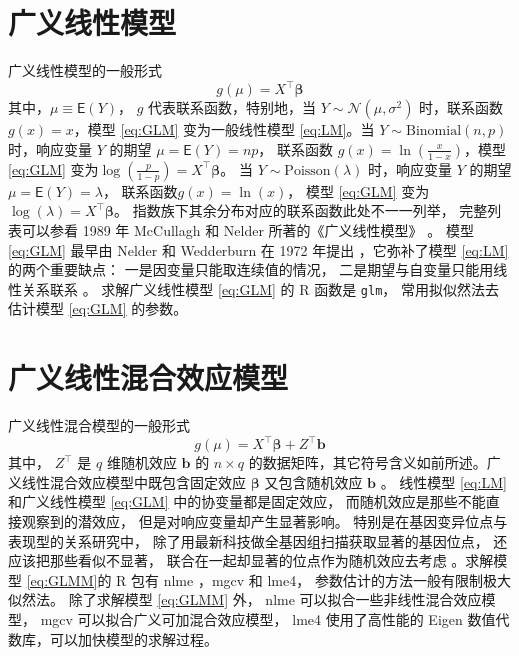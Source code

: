 \documentclass[12pt,a4paper,UTF8,twoside]{book}
\theoremstyle{definition}
\theoremstyle{definition}
\theoremstyle{definition}
\theoremstyle{remark}
\begin{document}
\hypertarget{sec:Generalized-Linear-Models}{%
\section{广义线性模型}\label{sec:Generalized-Linear-Models}}

广义线性模型的一般形式 \begin{equation}
g(\mu) = X^{\top}\boldsymbol{\beta}  \label{eq:GLM}
\end{equation} \noindent 其中，\(\mu \equiv \mathsf{E}(Y)\)， \(g\)
代表联系函数，特别地，当 \(Y \sim \mathcal{N}(\mu,\sigma^2)\)
时，联系函数 \(g(x) = x\)，模型 \eqref{eq:GLM} 变为一般线性模型
\eqref{eq:LM}。当 \(Y \sim \mathrm{Binomial}(n,p)\) 时，响应变量 \(Y\)
的期望 \(\mu =\mathsf{E}(Y) = np\)， 联系函数
\(g(x)=\ln(\frac{x}{1-x})\)，模型 \eqref{eq:GLM}
变为\(\log(\frac{p}{1-p})=X^{\top}\boldsymbol{\beta}\)。 当
\(Y \sim \mathrm{Poisson}(\lambda)\) 时，响应变量 \(Y\) 的期望
\(\mu =\mathsf{E}(Y) = \lambda\)， 联系函数\(g(x) = \ln(x)\)， 模型
\eqref{eq:GLM} 变为 \(\log(\lambda) = X^{\top}\boldsymbol{\beta}\)。
指数族下其余分布对应的联系函数此处不一一列举， 完整列表可以参看 1989 年
McCullagh 和 Nelder 所著的《广义线性模型》 \citep{McCullagh1989}。 模型
\eqref{eq:GLM} 最早由 Nelder 和 Wedderburn 在 1972 年提出
\citep{Nelder1972}，它弥补了模型 \eqref{eq:LM} 的两个重要缺点：
一是因变量只能取连续值的情况， 二是期望与自变量只能用线性关系联系
\citep{Chen2011}。 求解广义线性模型 \eqref{eq:GLM} 的 R 函数是
\texttt{glm}， 常用拟似然法去估计模型 \eqref{eq:GLM} 的参数。

\hypertarget{sec:Generalized-Linear-Mixed-Effects-Models}{%
\section{广义线性混合效应模型}\label{sec:Generalized-Linear-Mixed-Effects-Models}}

广义线性混合模型的一般形式 \begin{equation}
g(\mu) = X^{\top}\boldsymbol{\beta} + Z^{\top}\mathbf{b}  \label{eq:GLMM}
\end{equation} \noindent 其中， \(Z^{\top}\) 是 \(q\) 维随机效应
\(\mathbf{b}\) 的 \(n \times q\)
的数据矩阵，其它符号含义如前所述。广义线性混合效应模型中既包含固定效应
\(\boldsymbol{\beta}\) 又包含随机效应 \(\mathbf{b}\) 。 线性模型
\eqref{eq:LM} 和广义线性模型 \eqref{eq:GLM} 中的协变量都是固定效应，
而随机效应是那些不能直接观察到的潜效应， 但是对响应变量却产生显著影响。
特别是在基因变异位点与表现型的关系研究中，
除了用最新科技做全基因组扫描获取显著的基因位点，
还应该把那些看似不显著， 联合在一起却显著的位点作为随机效应去考虑
\citep{Yang2010Common}。求解模型 \eqref{eq:GLMM}的 R 包有 nlme ，mgcv 和
lme4， 参数估计的方法一般有限制极大似然法。 除了求解模型 \eqref{eq:GLMM}
外， nlme 可以拟合一些非线性混合效应模型， mgcv
可以拟合广义可加混合效应模型， lme4 使用了高性能的 Eigen
数值代数库，可以加快模型的求解过程。
\end{document}
